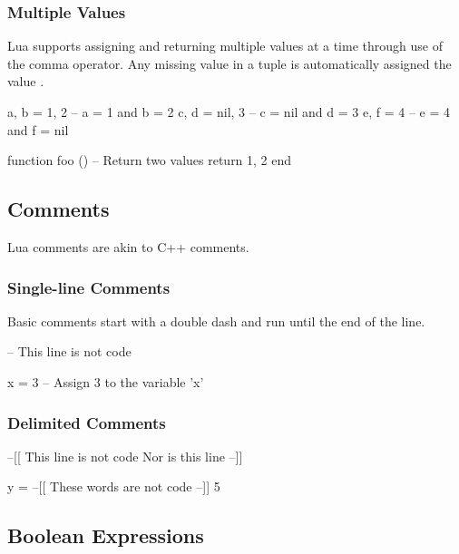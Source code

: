 \subsubsection{Multiple Values}

Lua supports assigning and returning multiple values at a time through use of
the comma operator.  Any missing value in a tuple is automatically assigned the
value .

\begin{LuaCode}
a, b = 1, 2   -- a = 1 and b = 2
c, d = nil, 3 -- c = nil and d = 3
e, f = 4      -- e = 4 and f = nil
\end{LuaCode}

\begin{LuaCode}
function foo ()
	-- Return two values
	return 1, 2
end
\end{LuaCode}

\subsection{Comments}

Lua comments are akin to C++ comments.

\subsubsection{Single-line Comments}

Basic comments start with a double dash and run until the end of the line.

\begin{LuaCode}
-- This line is not code
\end{LuaCode}

\begin{LuaCode}
x = 3 -- Assign 3 to the variable 'x'
\end{LuaCode}

\subsubsection{Delimited Comments}

\begin{LuaCode}
--[[
This line is not code
Nor is this line
--]]
\end{LuaCode}

\begin{LuaCode}
y = --[[ These words are not code --]] 5
\end{LuaCode}

\subsection{Boolean Expressions}

